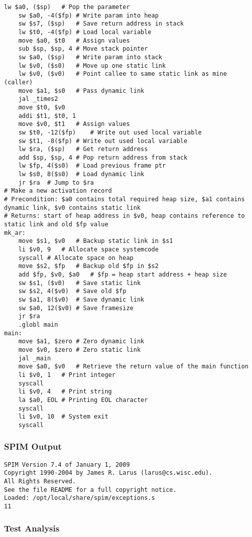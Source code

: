 \begin{lstlisting}[showstringspaces=false,breaklines=true,backgroundcolor=\color{light-gray}, captionpos=b]
	lw $a0, ($sp)	# Pop the parameter
	sw $a0, -4($fp)	# Write param into heap
	sw $s7, ($sp)	# Save return address in stack
	lw $t0, -4($fp)	# Load local variable
	move $a0, $t0	# Assign values
	sub $sp, $sp, 4	# Move stack pointer
	sw $a0, ($sp)	# Write param into stack
	lw $v0, ($s0)	# Move up one static link
	lw $v0, ($v0)	# Point callee to same static link as mine (caller)
	move $a1, $s0	# Pass dynamic link
	jal _times2
	move $t0, $v0
	addi $t1, $t0, 1
	move $v0, $t1	# Assign values
	sw $t0, -12($fp)	# Write out used local variable
	sw $t1, -8($fp)	# Write out used local variable
	lw $ra, ($sp)	# Get return address
	add $sp, $sp, 4	# Pop return address from stack
	lw $fp, 4($s0)	# Load previous frame ptr
	lw $s0, 8($s0)	# Load dynamic link
	jr $ra	# Jump to $ra
# Make a new activation record
# Precondition: $a0 contains total required heap size, $a1 contains dynamic link, $v0 contains static link
# Returns: start of heap address in $v0, heap contains reference to static link and old $fp value
mk_ar:
	move $s1, $v0	# Backup static link in $s1
	li $v0, 9	# Allocate space systemcode
	syscall	# Allocate space on heap
	move $s2, $fp	# Backup old $fp in $s2
	add $fp, $v0, $a0	# $fp = heap start address + heap size
	sw $s1, ($v0)	# Save static link
	sw $s2, 4($v0)	# Save old $fp
	sw $a1, 8($v0)	# Save dynamic link
	sw $a0, 12($v0)	# Save framesize
	jr $ra
	.globl main
main:
	move $a1, $zero	# Zero dynamic link
	move $v0, $zero	# Zero static link
	jal _main
	move $a0, $v0	# Retrieve the return value of the main function
	li $v0, 1	# Print integer
	syscall
	li $v0, 4	# Print string
	la $a0, EOL	# Printing EOL character
	syscall
	li $v0, 10	# System exit
	syscall

\end{lstlisting}\subsubsection{SPIM Output}
\begin{verbatim}
SPIM Version 7.4 of January 1, 2009
Copyright 1990-2004 by James R. Larus (larus@cs.wisc.edu).
All Rights Reserved.
See the file README for a full copyright notice.
Loaded: /opt/local/share/spim/exceptions.s
11
\end{verbatim}\subsubsection{Test Analysis}

